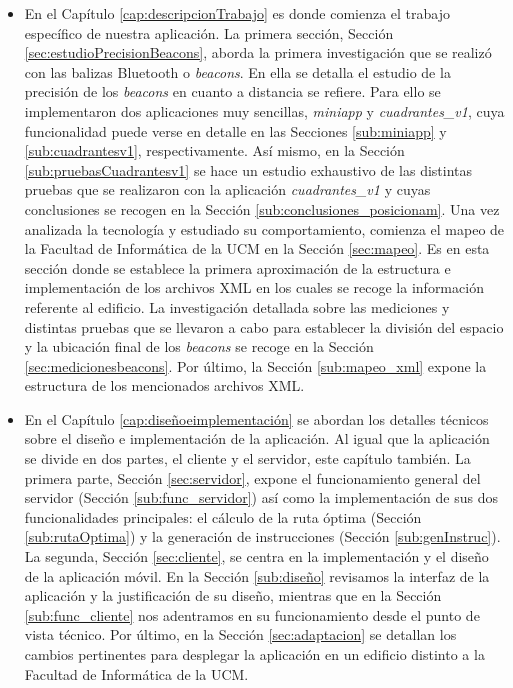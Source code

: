 \begin{itemize}
	\item En el Capítulo \ref{cap:descripcionTrabajo} es donde comienza el trabajo específico de nuestra aplicación. La primera sección, Sección \ref{sec:estudioPrecisionBeacons}, aborda la primera investigación que se realizó con las balizas Bluetooth o \textit{beacons}. En ella se detalla el estudio de la precisión de los \textit{beacons} en cuanto a distancia se refiere. Para ello se implementaron dos aplicaciones muy sencillas, \textit{miniapp} y \textit{cuadrantes\_v1}, cuya funcionalidad puede verse en detalle en las Secciones \ref{sub:miniapp} y \ref{sub:cuadrantesv1}, respectivamente. Así mismo, en la Sección \ref{sub:pruebasCuadrantesv1} se hace un estudio exhaustivo de las distintas pruebas que se realizaron con la aplicación \textit{cuadrantes\_v1} y cuyas conclusiones se recogen en la Sección \ref{sub:conclusiones_posicionam}. Una vez analizada la tecnología y estudiado su comportamiento, comienza el mapeo de la Facultad de Informática de la UCM en la Sección \ref{sec:mapeo}. Es en esta sección donde se establece la primera aproximación de la estructura e implementación de los archivos XML en los cuales se recoge la información referente al edificio. La investigación detallada sobre las mediciones y distintas pruebas que se llevaron a cabo para establecer la división del espacio y la ubicación final de los \textit{beacons} se recoge en la Sección \ref{sec:medicionesbeacons}. Por último, la Sección \ref{sub:mapeo_xml} expone la estructura de los mencionados archivos XML.
	
	\item En el Capítulo \ref{cap:diseñoeimplementación} se abordan los detalles técnicos sobre el diseño e implementación de la aplicación. Al igual que la aplicación se divide en dos partes, el cliente y el servidor, este capítulo también. La primera parte, Sección \ref{sec:servidor}, expone el funcionamiento general del servidor (Sección \ref{sub:func_servidor}) así como la implementación de sus dos funcionalidades principales: el cálculo de la ruta óptima (Sección \ref{sub:rutaOptima}) y la generación de instrucciones (Sección \ref{sub:genInstruc}). La segunda, Sección \ref{sec:cliente}, se centra en la implementación y el diseño de la aplicación móvil. En la Sección \ref{sub:diseño} revisamos la interfaz de la aplicación y la justificación de su diseño, mientras que en la Sección \ref{sub:func_cliente} nos adentramos en su funcionamiento desde el punto de vista técnico. Por último, en la Sección \ref{sec:adaptacion} se detallan los cambios pertinentes para desplegar la aplicación en un edificio distinto a la Facultad de Informática de la UCM.
	

\end{itemize}
